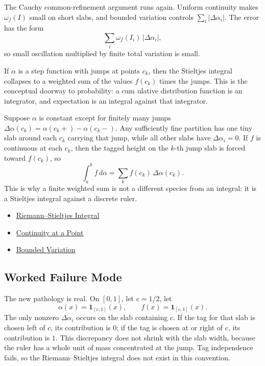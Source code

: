 \begin{remark*}[Interpretation]
The Cauchy common-refinement argument runs again. Uniform continuity makes
\(\omega_f(I)\) small on short slabs, and bounded variation controls
\(\sum_i|\Delta\alpha_i|\). The error has the form
\[
  \sum_i \omega_f(I_i)\,|\Delta\alpha_i|,
\]
so small oscillation multiplied by finite total variation is small.


If \(\alpha\) is a step function with jumps at points \(c_k\), then the
Stieltjes integral collapses to a weighted sum of the values \(f(c_k)\) times
the jumps. This is the conceptual doorway to probability: a cum
ulative
distribution function is an integrator, and expectation is an integral against
that integrator.


Suppose \(\alpha\) is constant except for finitely many jumps
\(\Delta\alpha(c_k)=\alpha(c_k+)-\alpha(c_k-)\). Any sufficiently fine
partition has one tiny slab around each \(c_k\) carrying that jump, while all
other slabs have \(\Delta\alpha_i=0\). If \(f\) is continuous at each \(c_k\),
then the tagged height on the \(k\)-th jump slab is forced toward \(f(c_k)\),
so
\[
  \int_a^b f\,d\alpha=\sum_k f(c_k)\,\Delta\alpha(c_k).
\]
This is why a finite weighted sum is not a different species from an integral:
it is a Stieltjes integral against a discrete ruler.
\end{remark*}

\begin{dependencies}
\begin{itemize}
  \item \hyperref[def:riemann-stieltjes-integral]{Riemann--Stieltjes Integral}
  \item \hyperref[def:continuous-at-point]{Continuity at a Point}
  \item \hyperref[def:bounded-variation-integration]{Bounded Variation}
\end{itemize}
\end{dependencies}

\subsection*{Worked Failure Mode}

\begin{remark*}[Interpretation]
The new pathology is real. On \([0,1]\), let \(c=1/2\), let
\[
  \alpha(x)=\mathbf 1_{[c,1]}(x),
  \qquad
  f(x)=\mathbf 1_{[c,1]}(x).
\]
The only nonzero \(\Delta\alpha_i\) occurs on the slab containing \(c\). If the
tag for that slab is chosen left of \(c\), its contribution is \(0\); if the
tag is chosen at or right of \(c\), its contribution is \(1\). This discrepancy
does not shrink with the slab width, because the ruler has a whole unit of
mass concentrated at the jump. Tag independence fails, so the
Riemann--Stieltjes integral does not exist in this convention.
\end{remark*}

